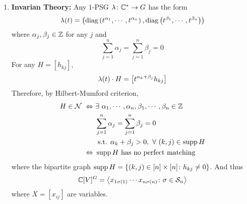 \documentclass[a4paper,12pt]{article}
\begin{document}
	\begin{enumerate}
		\item \textbf{Invarian Theory:} Any $1$-PSG $\lambda \colon \mathbb{C}^* \rightarrow G$ has the form
		\begin{equation*}
			\lambda(t) = \left(\operatorname{diag}\left(t^{\alpha_1},\cdots,t^{\alpha_n}\right),\operatorname{diag}\left(t^{\beta_1},\cdots,t^{\beta_n}\right)\right)
		\end{equation*}
		where $\alpha_j,\beta_j \in \mathbb{Z}$ for any $j$ and
		\begin{equation*}
			\sum_{j=1}^n \alpha_j = \sum_{j=1}^n \beta_j = 0
		\end{equation*}
		For any $H =[h_{kj}]$, 
		\begin{equation*}
			\lambda(t) \cdot H = \left[t^{\alpha_k+\beta_j}h_{kj}\right]
		\end{equation*}
		Therefore, by Hilbert-Mumford criterion,
		\begin{equation*}
			\begin{split}
				H \in \mathcal{N}~\Leftrightarrow~&\exists~\alpha_1,\cdots,\alpha_n,\beta_1,\cdots,\beta_n \in \mathbb{Z} \\
				& \sum_{j=1}^n \alpha_j = \sum_{j=1}^n \beta_j = 0 \\
				& \text{ s.t. }\alpha_k+\beta_j > 0,~\forall~ (k,j) \in \operatorname{supp} H\\
				\Leftrightarrow~& \operatorname{supp} H\text{ has no perfect matching}
			\end{split}
		\end{equation*}
		where the bipartite graph $\operatorname{supp} H = \left\{(k,j) \in [n]\times[n] \colon h_{kj} \neq 0\right\}$. And thus
		\begin{equation*}
			\mathbb{C}[V]^G = \left\langle x_{1\sigma(1)}\cdots x_{n\sigma(n)} \colon \sigma \in \mathcal{S}_n \right\rangle
		\end{equation*}
		where $X=[x_{ij}]$ are variables.


\end{enumerate}
\end{document}
